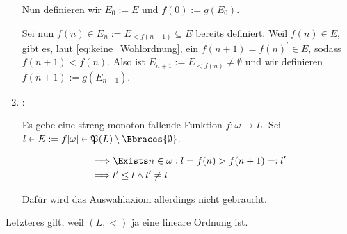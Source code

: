 \begin{solution}
\begin{enumerate}[label = \texttt{ad}]
    Nun definieren wir $E_0 := E$ und $f(0) := g(E_0)$.

    Sei nun $f(n) \in E_{n} := E_{< f(n-1)} \subseteq E$ bereits definiert.
    Weil $f(n) \in E$, gibt es, laut \eqref{eq:keine_Wohlordnung}, ein $f(n + 1) = f(n)^\prime \in E$, sodass $f(n + 1) < f(n)$.
    Also ist $E_{n+1} := E_{<f(n)} \neq \emptyset$ und wir definieren $f(n+1) := g(E_{n+1})$.

    \item \Quote{$\impliedby$}:

    Es gebe eine streng monoton fallende Funktion $f: \omega \to L$.
    Sei $l \in E := f[\omega] \in \mathfrak{P}(L) \setminus \Bbraces{\emptyset}$.

    \begin{align*}
        \implies &
        \Exists n \in \omega:
            l = f(n) > f(n + 1) =: l^\prime \\
        \implies &
        l^\prime \leq l \land l^\prime \neq l
    \end{align*}

    Dafür wird das Auswahlaxiom allerdings nicht gebraucht.

\end{enumerate}

Letzteres \Quote{!} gilt, weil $(L, <)$ ja eine lineare Ordnung ist.

\end{solution}

